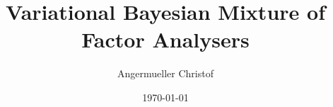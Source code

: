 \documentclass[a4paper]{article}
\author{Angermueller Christof}
\date{\today}
\title{Variational Bayesian Mixture of Factor Analysers}
\begin{document}
\maketitle

\newcommand{\bs}{\boldsymbol}
\newcommand{\Xp}{\bs{\pi}}

\newcommand{\Xn}{\bs{\nu}^s}
\newcommand{\Xnq}{\nu^s_q}

\newcommand{\Xl}{\Lambda^s}
\newcommand{\Xlp}{\bs{\Lambda}^s_p}
\newcommand{\Xlpq}{\Lambda^s_{pq}}
\newcommand{\Xlm}{\overline{\Lambda}^s}
\newcommand{\Xlmp}{\bar{\bs{\Lambda}}^s_p}
\newcommand{\Xlvp}{\Sigma^{p,s}}
\newcommand{\Xlvpi}{\Xlvp{}^{-1}}
\newcommand{\Xlvpll}{\Xlvp_{\Lambda\Lambda}}
\newcommand{\Xlvplu}{\Xlvp_{\Lambda\mu}}
\newcommand{\Xlvpul}{\Xlvp_{\mu\Lambda}}
\newcommand{\Xlvpuu}{\Xlvp_{\mu\mu}}
\newcommand{\Xlvplli}{\Xlvpll{}^{-1}}
\newcommand{\Xlvplui}{\Xlvplu{}^{-1}}
\newcommand{\Xlvpuli}{\Xlvpul{}^{-1}}
\newcommand{\Xlvpuui}{\Xlvpuu{}^{-1}}
\newcommand{\Xlt}{\tilde{\Lambda}^s}
\newcommand{\Xltb}{\tilde{{\bs{\Lambda}}}^s}
\newcommand{\Xltp}{\tilde{\bs{\Lambda}}^s_p}
\newcommand{\Xltpq}{\tilde{\Lambda}^s_{pq}}
\newcommand{\Xltm}{\bar{\tilde{\Lambda}}^s}
\newcommand{\Xltmp}{\bar{\tilde{\bs{\Lambda}}}^s_p}
\newcommand{\Xltmpq}{\bar{\tilde{\Lambda}}^s_{pq}}
\newcommand{\Xltvp}{\tilde{\Gamma}^{p,s}}
\newcommand{\Xltvpi}{\Xltvp{}^{-1}}

\newcommand{\Xu}{\bs{\mu}^s}
\newcommand{\Xup}{\mu^s_p}
\newcommand{\Xum}{\bar{\bs{\mu}}^s}
\newcommand{\Xump}{\bar{\mu}^s_p}

\newcommand{\Xy}{\bs{y}^n}
\newcommand{\Xs}{s^n}

\newcommand{\Xx}{\bs{x}^n}
\newcommand{\Xxm}{\overline{\bs{x}}^{n,s}}
\newcommand{\Xxv}{\Sigma^s}
\newcommand{\Xxt}{\tilde{\bs{x}}^n}
\newcommand{\Xxtq}{\tilde{x}^n_q}
\newcommand{\Xxtm}{\bar{\tilde{\bs{x}}}^n}
\newcommand{\Xxtmq}{\bar{\tilde{x}}^n_q}
\newcommand{\Xxtv}{\tilde{\Sigma}^s}

\newcommand{\Xpsi}{\Psi}
\newcommand{\Xpsii}{\Psi^{-1}}
\newcommand{\Xha}{a^*}
\newcommand{\Xhb}{b^*}
\newcommand{\Xhal}{\alpha^*}
\newcommand{\Xhm}{\bs{m}^*}
\newcommand{\Xhms}{m^*_s}
\newcommand{\Xhu}{\bs{\mu}^*}
\newcommand{\Xhup}{\mu^*_p}
\newcommand{\Xhn}{\bs{\nu}^*}
\newcommand{\Xhnp}{\nu^*_p}

\newcommand{\Xcov}{\operatorname{cov}}
\newcommand{\Xvar}{\operatorname{var}}
\newcommand{\Xtr}{\operatorname{tr}}
\newcommand{\Xdiag}{\operatorname{diag}}
\newcommand{\Xvec}{\operatorname{vec}}
\end{document}
